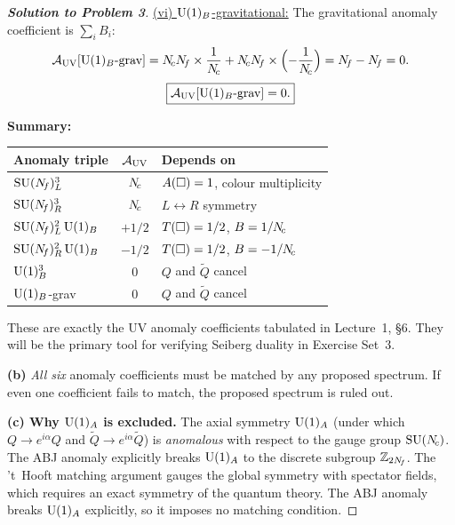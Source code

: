 \documentclass[11pt,a4paper]{article}
\begin{document}
\begin{proof}[\textbf{Solution to Problem 3}]
\underline{(vi) $\mathrm{U}(1)_B$-gravitational:}
The gravitational anomaly coefficient is $\sum_i B_i$:
\begin{equation}
  \mathcal{A}_{\UV}[\UU{1}_B\text{-grav}]
  = \Nc\Nf \times \frac{1}{\Nc}
  + \Nc\Nf \times \Bigl(-\frac{1}{\Nc}\Bigr)
  = \Nf - \Nf = 0.
\end{equation}
\begin{equation}
  \boxed{%
  \mathcal{A}_{\UV}[\UU{1}_B\text{-grav}] = 0.
  }
\end{equation}

\textbf{Summary:}

\begin{center}
\renewcommand{\arraystretch}{1.3}
\begin{tabular}{@{}l c l@{}}
\toprule
\textbf{Anomaly triple} & $\mathcal{A}_{\mathrm{UV}}$ & \textbf{Depends on} \\
\midrule
$\mathrm{SU}(N_{\!f})_L^3$ & $N_{\!c}$ & $A(\square) = 1$, colour multiplicity \\
$\mathrm{SU}(N_{\!f})_R^3$ & $N_{\!c}$ & $L \leftrightarrow R$ symmetry \\
$\mathrm{SU}(N_{\!f})_L^2\,\mathrm{U}(1)_B$ & $+1/2$ & $T(\square) = 1/2$, $B = 1/N_{\!c}$ \\
$\mathrm{SU}(N_{\!f})_R^2\,\mathrm{U}(1)_B$ & $-1/2$ & $T(\square) = 1/2$, $B = -1/N_{\!c}$ \\
$\mathrm{U}(1)_B^3$ & $0$ & $Q$ and $\widetilde{Q}$ cancel \\
$\mathrm{U}(1)_B$-grav & $0$ & $Q$ and $\widetilde{Q}$ cancel \\
\bottomrule
\end{tabular}
\end{center}

These are exactly the UV anomaly coefficients tabulated in Lecture~1,
\S6.  They will be the primary tool for verifying
Seiberg duality in Exercise Set~3.

\textbf{(b)} \emph{All six} anomaly coefficients must be matched by any
proposed \IR{} spectrum.  If even one coefficient fails to match, the
proposed spectrum is ruled out.

\textbf{(c) Why $\mathrm{U}(1)_A$ is excluded.}
The axial symmetry $\mathrm{U}(1)_A$ (under which $Q \to e^{i\alpha}Q$ and
$\widetilde{Q} \to e^{i\alpha}\widetilde{Q}$) is \emph{anomalous} with
respect to the gauge group $\mathrm{SU}(N_{\!c})$.  The ABJ anomaly explicitly breaks
$\mathrm{U}(1)_A$ to the discrete subgroup $\mathbb{Z}_{2N_{\!f}}$.  The 't~Hooft
matching argument gauges the global symmetry with spectator fields, which
requires an exact symmetry of the quantum theory.  The ABJ anomaly breaks
$\mathrm{U}(1)_A$ explicitly, so it imposes no matching condition.
\end{proof}
\end{document}
